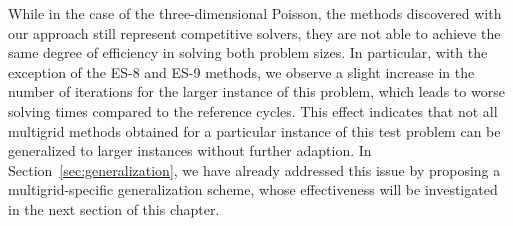 While in the case of the three-dimensional Poisson, the methods discovered with our approach still represent competitive solvers, they are not able to achieve the same degree of efficiency in solving both problem sizes.
In particular, with the exception of the ES-8 and ES-9 methods, we observe a slight increase in the number of iterations for the larger instance of this problem, which leads to worse solving times compared to the reference cycles.
This effect indicates that not all multigrid methods obtained for a particular instance of this test problem can be generalized to larger instances without further adaption.
In Section~\ref{sec:generalization}, we have already addressed this issue by proposing a multigrid-specific generalization scheme, whose effectiveness will be investigated in the next section of this chapter.   

